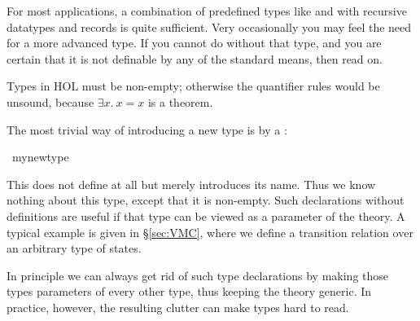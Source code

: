 %
\begin{isabellebody}%
\def\isabellecontext{Typedef}%
%
%
\begin{isamarkuptext}%
\label{sec:adv-typedef}
For most applications, a combination of predefined types like  and
\isa{{\isasymRightarrow}} with recursive datatypes and records is quite sufficient. Very
occasionally you may feel the need for a more advanced type. If you cannot do
without that type, and you are certain that it is not definable by any of the
standard means, then read on.
\begin{warn}
  Types in HOL must be non-empty; otherwise the quantifier rules would be
  unsound, because $\exists x.\ x=x$ is a theorem.
\end{warn}%
\end{isamarkuptext}%
%
%
\begin{isamarkuptext}%
\label{sec:typedecl}
The most trivial way of introducing a new type is by a :%
\end{isamarkuptext}%
\ my{\isacharunderscore}new{\isacharunderscore}type%
\begin{isamarkuptext}%
\noindent{}%
This does not define  at all but merely introduces its
name. Thus we know nothing about this type, except that it is
non-empty. Such declarations without definitions are
useful if that type can be viewed as a parameter of the theory.
A typical example is given in \S\ref{sec:VMC}, where we define a transition
relation over an arbitrary type of states.

In principle we can always get rid of such type declarations by making those
types parameters of every other type, thus keeping the theory generic. In
practice, however, the resulting clutter can make types hard to read.


\end{isamarkuptext}
\end{isabellebody}

